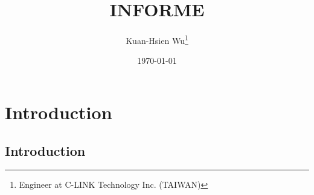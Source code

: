 \documentclass[a4paper]{article}
\title{INFORME}
\author{Kuan-Hsien Wu\thanks{Engineer at C-LINK Technology Inc. (TAIWAN)}}
\date{\today}
\begin{document}
\maketitle
\tableofcontents

\section{Introduction}

\subsection{Introduction}
\end{document}
